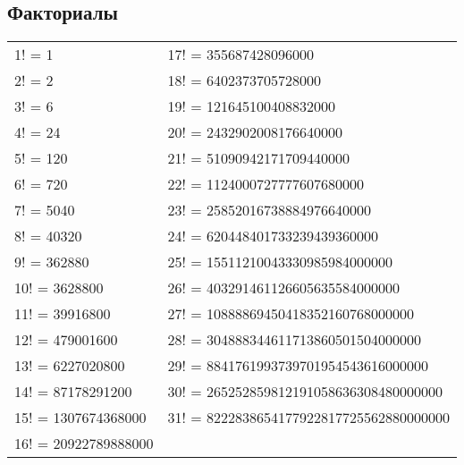 \documentclass[12pt, a4paper]{article}
\begin{document}
\subsection{Факториалы}


\begin{tabular}{ll}
1!  = 1 & 17! = 355687428096000 \\
2!  = 2 & 18! = 6402373705728000 \\
3!  = 6 & 19! = 121645100408832000 \\
4!  = 24 & 20! = 2432902008176640000 \\
5!  = 120 & 21! = 51090942171709440000 \\
6!  = 720 & 22! = 1124000727777607680000 \\
7!  = 5040 & 23! = 25852016738884976640000 \\
8!  = 40320  & 24! = 620448401733239439360000 \\
9!  = 362880 & 25! = 15511210043330985984000000 \\
10! = 3628800 & 26! = 403291461126605635584000000 \\
11! = 39916800 &  27! = 10888869450418352160768000000 \\
12! = 479001600 & 28! = 304888344611713860501504000000 \\
13! = 6227020800 & 29! = 8841761993739701954543616000000 \\
14! = 87178291200 & 30! = 265252859812191058636308480000000 \\
15! = 1307674368000 & 31! = 8222838654177922817725562880000000 \\
16! = 20922789888000 & 
\end{tabular}
\\ 
\newline 
\end{document}
